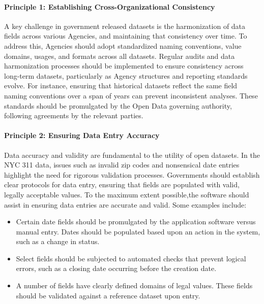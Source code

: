 \documentclass[linenumber]{jdsart}
\begin{document}
\paragraph{Principle 1: Establishing Cross-Organizational Consistency}
A key challenge in government released datasets is the 
harmonization of data fields across various Agencies, and 
maintaining that consistency over time. To address this, Agencies should adopt 
standardized naming conventions, value domains, usages, and 
formats across all datasets. Regular audits and data harmonization 
processes should be implemented to ensure consistency 
across long-term datasets, particularly as Agency structures 
and reporting standards evolve. For instance, ensuring that 
historical datasets reflect the same field naming conventions 
over a span of years can prevent inconsistent analyses. 
These standards should be promulgated by the Open Data 
governing authority, following agreements by the relevant parties.

\paragraph{Principle 2: Ensuring Data Entry Accuracy}
Data accuracy and validity are fundamental to the utility of 
open datasets. In the NYC 311 data, issues such as 
invalid zip codes and nonsensical date entries 
highlight the need for rigorous validation processes. Governments 
should establish clear protocols for data entry, ensuring that 
fields are populated with valid, legally acceptable values. To 
the maximum extent possible,the software should assist in 
ensuring data entries are accurate and valid. Some examples include:

\begin{itemize}[left=1.5em]
    \item Certain date fields should be promulgated by the application software
     versus manual entry. Dates should be populated
    based upon an action in the system, such as a change in status. 
       
    \item Select fields should be subjected to automated checks 
    that prevent logical errors, such as a closing date occurring before the creation date. 
    
    \item A number of fields have clearly defined domains of legal
    values. These fields should be validated against a reference 
    dataset upon entry. 
 \end{itemize}
\end{document}
